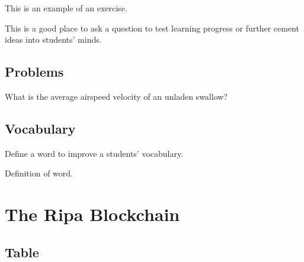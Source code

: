 \documentclass[11pt,fleqn]{book} %
\begin{document}
This is an example of an exercise.

\begin{exercise}
	This is a good place to ask a question to test learning progress or further cement ideas into students' minds.
\end{exercise}


\section{Problems}

\begin{problem}
What is the average airspeed velocity of an unladen swallow?
\end{problem}


\section{Vocabulary}

Define a word to improve a students' vocabulary.

\begin{vocabulary}[Word]
	Definition of word.
\end{vocabulary}





\chapter{The Ripa Blockchain}

\section{Table}
\end{document}
